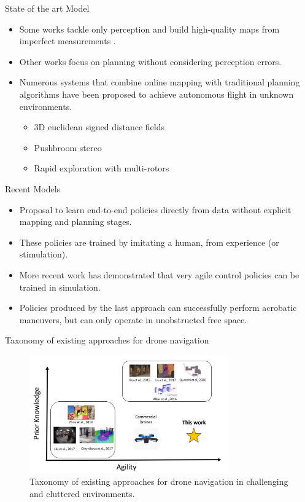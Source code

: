 \documentclass{beamer}
\begin{document}
\begin{frame}{State of the art Model}
	\begin{itemize}
		\item Some works tackle only perception and build high-quality maps from imperfect measurements \autocite{fastPlanner}. 
		\item Other works focus on planning without considering perception errors. \autocite{reactive_method}
		\item Numerous systems that combine online mapping with traditional planning algorithms have been proposed to achieve autonomous flight in unknown environments.
		\begin{itemize}
			\item 3D euclidean signed distance fields
			\item Pushbroom stereo
			\item Rapid exploration with multi-rotors
		\end{itemize} 
	\end{itemize}
\end{frame}

\begin{frame}{Recent Models}
	\begin{itemize}
		\item Proposal to learn end-to-end policies directly from data without explicit mapping and planning stages. 
		\item These policies are trained by imitating a human, from experience (or stimulation). 
		\item More recent work has demonstrated that very agile control policies can be trained in simulation. 
		\item Policies produced by the last approach can successfully perform acrobatic maneuvers, but can only operate in unobstructed free space.
	\end{itemize}
\end{frame}

\begin{frame}{Taxonomy of existing approaches for drone navigation}
	\centering
	\begin{figure}
		\includegraphics[height=2in]{images/taxonomy_navigation.png}
		\caption{Taxonomy of existing approaches for drone navigation in challenging and cluttered environments.}
	\end{figure}
\end{frame}
\end{document}
